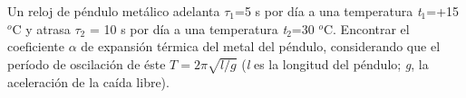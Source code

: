 
Un reloj de péndulo metálico adelanta $\tau_1$=5 s por día a una temperatura \textit{t}$_1$=+15 $^o$C y atrasa $\tau_2$ = 10 s por día a una temperatura \textit{t}$_2$=30 $^o$C. Encontrar el coeficiente $\alpha$ de expansión térmica del metal del péndulo, considerando que el período de oscilación de éste $T = 2\pi \sqrt{l/g}$ (\textit{l} es la longitud del péndulo; \textit{g}, la aceleración de la caída libre).